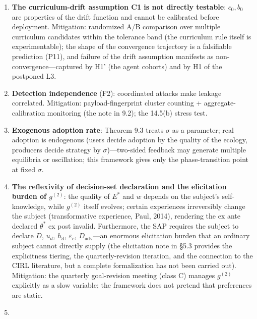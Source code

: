 \documentclass[
  11pt]{article}
\begin{document}
\begin{enumerate}
  the MVT (Proposition 8.2) assume stationary payoff distributions,
  whereas real source quality drifts. Mitigation: rolling estimation +
  CUSUM drift detection (the note in 8.3); restless-bandit scheduling
  (8.6) is heuristic, and its asymptotic optimality holds only in the
  many-armed limit (Weber \& Weiss, 1990).
\item
  \textbf{The curriculum-drift assumption C1 is not directly testable}:
  \(c_0, b_0\) are properties of the drift function and cannot be
  calibrated before deployment. Mitigation: randomized A/B comparison
  over multiple curriculum candidates within the tolerance band (the
  curriculum rule itself is experimentable); the shape of the
  convergence trajectory is a falsifiable prediction (P11), and failure
  of the drift assumption manifests as non-convergence---captured by H1'
  (the agent cohorts) and by H1 of the postponed L3.
\item
  \textbf{Detection independence} (F2): coordinated attacks make leakage
  correlated. Mitigation: payload-fingerprint cluster counting +
  aggregate-calibration monitoring (the note in 9.2); the 14.5(b) stress
  test.
\item
  \textbf{Exogenous adoption rate}: Theorem 9.3 treats \(\sigma\) as a
  parameter; real adoption is endogenous (users decide adoption by the
  quality of the ecology, producers decide strategy by
  \(\sigma\))---two-sided feedback may generate multiple equilibria or
  oscillation; this framework gives only the phase-transition point at
  fixed \(\sigma\).
\item
  \textbf{The reflexivity of decision-set declaration and the
  elicitation burden of \(g^{(2)}\)}: the quality of \(E^*\) and \(w\)
  depends on the subject's self-knowledge, while \(g^{(2)}\) itself
  evolves; certain experiences irreversibly change the subject
  (transformative experience, Paul, 2014), rendering the ex ante
  declared \(\theta^*\) ex post invalid. Furthermore, the SAP requires
  the subject to declare \(D\), \(u_d\), \(h_d\), \(\varepsilon_c\),
  \(D_{\mathrm{adv}}\)---an enormous elicitation burden that an ordinary
  subject cannot directly supply (the elicitation note in §5.3 provides
  the explicitness tiering, the quarterly-revision iteration, and the
  connection to the CIRL literature, but a complete formalization has
  not been carried out). Mitigation: the quarterly goal-revision meeting
  (class C) manages \(g^{(2)}\) explicitly as a slow variable; the
  framework does not pretend that preferences are static.
\item

\end{enumerate}
\end{document}
